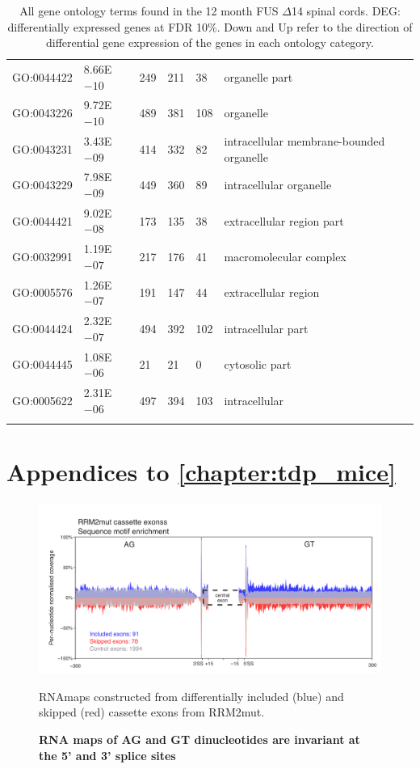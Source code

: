 \begin{appendices}
\begin{longtable}{| p{} | p{} |p{} | p{} |p{} | p{} |}
		GO:0044422 & 8.66E$-10$ & 249 & 211 & 38 & organelle part \\ 
		GO:0043226 & 9.72E$-10$ & 489 & 381 & 108 & organelle \\ 
		GO:0043231 & 3.43E$-09$ & 414 & 332 & 82 & intracellular membrane-bounded organelle \\ 
		GO:0043229 & 7.98E$-09$ & 449 & 360 & 89 & intracellular organelle \\ 
		GO:0044421 & 9.02E$-08$ & 173 & 135 & 38 & extracellular region part \\ 
		GO:0032991 & 1.19E$-07$ & 217 & 176 & 41 & macromolecular complex \\ 
		GO:0005576 & 1.26E$-07$ & 191 & 147 & 44 & extracellular region \\ 
		GO:0044424 & 2.32E$-07$ & 494 & 392 & 102 & intracellular part \\ 
		GO:0044445 & 1.08E$-06$ & 21 & 21 & 0 & cytosolic part \\ 
		GO:0005622 & 2.31E$-06$ & 497 & 394 & 103 & intracellular \\ 
		\hline 
	\caption{All gene ontology terms found in the 12 month FUS $\Delta$14 spinal cords. DEG: differentially expressed genes at FDR 10\%. Down and Up refer to the direction of differential gene expression of the genes in each ontology category.} 
	\label{append:d14_spinal_go} 
\end{longtable} 

\cleardoublepage

\section*{Appendices to   \autoref{chapter:tdp_mice} }

\begin{figure}[h]
	\centering
	\includegraphics[width=14cm]{Figures/05_tdp_mice/RNAmap_motif_AG_GT_RRM2mut.png}
	\caption{\textbf{RNA maps of AG and GT dinucleotides are invariant at the 5' and 3' splice sites}}
	RNAmaps constructed from differentially included (blue) and skipped (red) cassette exons from RRM2mut.
	

\end{figure}
\end{appendices}
